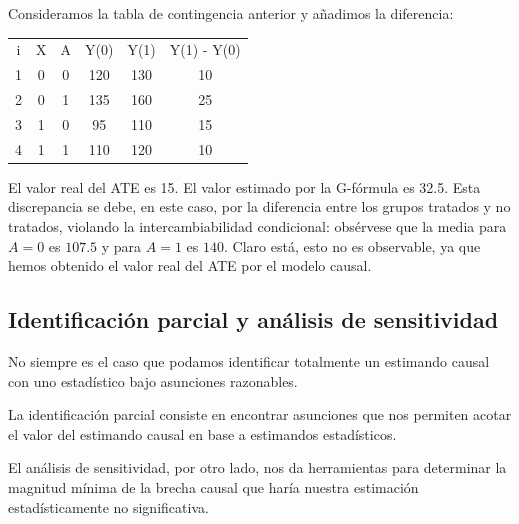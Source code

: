 \begin{ejemplo}[ATE]
	Consideramos la tabla de contingencia anterior y añadimos la diferencia:
	\begin{center}
		\begin{tabular}{ C | C C | C C | C}
			i & X & A & Y(0) & Y(1) & Y(1) - Y(0) \\
			1 & 0 & 0 & 120  & 130  & 10          \\
			2 & 0 & 1 & 135  & 160  & 25          \\
			3 & 1 & 0 & 95   & 110  & 15          \\
			4 & 1 & 1 & 110  & 120  & 10
		\end{tabular}
	\end{center}
	El valor real del ATE es 15. El valor estimado por la G-fórmula es 32.5. Esta discrepancia se debe, en este caso,
	por la diferencia entre los grupos tratados y no tratados, violando la intercambiabilidad condicional:
	obsérvese que la media para $A = 0$ es $107.5$ y para $A=1$ es $140$.
	Claro está, esto no es observable, ya que hemos obtenido el valor real del ATE por el modelo causal.
\end{ejemplo}

\subsection{Identificación parcial y análisis de sensitividad}
No siempre es el caso que podamos identificar totalmente un estimando causal con uno estadístico bajo
asunciones razonables.

La identificación parcial consiste en encontrar asunciones que nos permiten acotar el valor del estimando
causal en base a estimandos estadísticos.

El análisis de sensitividad, por otro lado, nos da herramientas para determinar la magnitud
mínima de la brecha causal que haría nuestra estimación estadísticamente no significativa.

